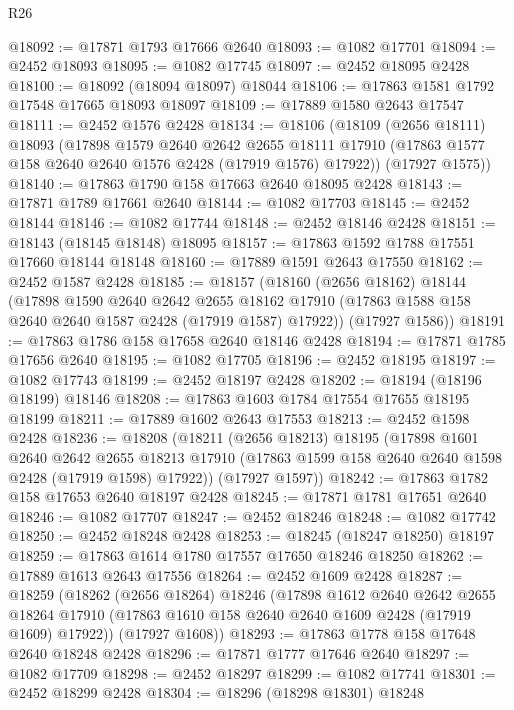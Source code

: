 \begin{lexlean}{R26}
\begin{coremodule}
@18092 := @17871 @1793 @17666 @2640
@18093 := @1082 @17701
@18094 := @2452 @18093
@18095 := @1082 @17745
@18097 := @2452 @18095 @2428
@18100 := @18092 (@18094 @18097) @18044
@18106 := @17863 @1581 @1792 @17548 @17665 @18093 @18097
@18109 := @17889 @1580 @2643 @17547
@18111 := @2452 @1576 @2428
@18134 := @18106
    (@18109
      (@2656 @18111)
      @18093
      (@17898
        @1579
        @2640
        @2642
        @2655
        @18111
        @17910
        (@17863 @1577 @158 @2640 @2640 @1576 @2428 (@17919 @1576) @17922))
      (@17927 @1575))
@18140 := @17863 @1790 @158 @17663 @2640 @18095 @2428
@18143 := @17871 @1789 @17661 @2640
@18144 := @1082 @17703
@18145 := @2452 @18144
@18146 := @1082 @17744
@18148 := @2452 @18146 @2428
@18151 := @18143 (@18145 @18148) @18095
@18157 := @17863 @1592 @1788 @17551 @17660 @18144 @18148
@18160 := @17889 @1591 @2643 @17550
@18162 := @2452 @1587 @2428
@18185 := @18157
    (@18160
      (@2656 @18162)
      @18144
      (@17898
        @1590
        @2640
        @2642
        @2655
        @18162
        @17910
        (@17863 @1588 @158 @2640 @2640 @1587 @2428 (@17919 @1587) @17922))
      (@17927 @1586))
@18191 := @17863 @1786 @158 @17658 @2640 @18146 @2428
@18194 := @17871 @1785 @17656 @2640
@18195 := @1082 @17705
@18196 := @2452 @18195
@18197 := @1082 @17743
@18199 := @2452 @18197 @2428
@18202 := @18194 (@18196 @18199) @18146
@18208 := @17863 @1603 @1784 @17554 @17655 @18195 @18199
@18211 := @17889 @1602 @2643 @17553
@18213 := @2452 @1598 @2428
@18236 := @18208
    (@18211
      (@2656 @18213)
      @18195
      (@17898
        @1601
        @2640
        @2642
        @2655
        @18213
        @17910
        (@17863 @1599 @158 @2640 @2640 @1598 @2428 (@17919 @1598) @17922))
      (@17927 @1597))
@18242 := @17863 @1782 @158 @17653 @2640 @18197 @2428
@18245 := @17871 @1781 @17651 @2640
@18246 := @1082 @17707
@18247 := @2452 @18246
@18248 := @1082 @17742
@18250 := @2452 @18248 @2428
@18253 := @18245 (@18247 @18250) @18197
@18259 := @17863 @1614 @1780 @17557 @17650 @18246 @18250
@18262 := @17889 @1613 @2643 @17556
@18264 := @2452 @1609 @2428
@18287 := @18259
    (@18262
      (@2656 @18264)
      @18246
      (@17898
        @1612
        @2640
        @2642
        @2655
        @18264
        @17910
        (@17863 @1610 @158 @2640 @2640 @1609 @2428 (@17919 @1609) @17922))
      (@17927 @1608))
@18293 := @17863 @1778 @158 @17648 @2640 @18248 @2428
@18296 := @17871 @1777 @17646 @2640
@18297 := @1082 @17709
@18298 := @2452 @18297
@18299 := @1082 @17741
@18301 := @2452 @18299 @2428
@18304 := @18296 (@18298 @18301) @18248

\end{coremodule}
\end{lexlean}

